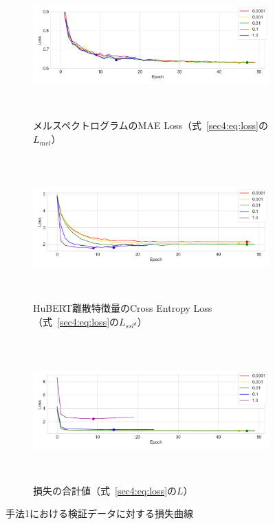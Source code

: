 \documentclass[12pt]{jarticle}
\numberwithin{equation}{section}    %
\numberwithin{figure}{section}      %
\numberwithin{table}{section}      %
\begin{document}
\begin{figure}[bt]
    \centering
    \begin{subfigure}{\linewidth}
        \centering
        \includegraphics[height=55mm]{./figure/sec4/loss_curve/0/mel_loss.png}
        \caption{メルスペクトログラムのMAE Loss（式~\eqref{sec4:eq:loss}の$L_{mel}$）}
        \label{sec4:fig:method_1_val_mel_loss}
    \end{subfigure}
    \begin{subfigure}{\linewidth}
        \centering
        \includegraphics[height=55mm]{./figure/sec4/loss_curve/0/ssl_feature_cluster_loss.png}
        \caption{HuBERT離散特徴量のCross Entropy Loss（式~\eqref{sec4:eq:loss}の$L_{ssl^{d}}$）}
        \label{sec4:fig:method_1_val_ssl_feature_cluster_loss}
    \end{subfigure}
    \begin{subfigure}{\linewidth}
        \centering
        \includegraphics[height=55mm]{./figure/sec4/loss_curve/0/total_loss.png}
        \caption{損失の合計値（式~\eqref{sec4:eq:loss}の$L$）}
        \label{sec4:fig:method_1_val_total_loss}
    \end{subfigure}
    \caption{手法1における検証データに対する損失曲線}
    \label{sec4:fig:method_1_val_losses}
\end{figure}
\end{document}

